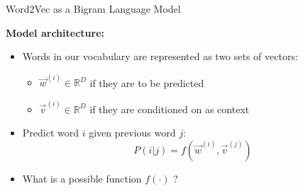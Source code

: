 \documentclass[11pt,compress,t,notes=noshow, xcolor=table]{beamer}
\begin{document}







\begin{vbframe}{Word2Vec as a Bigram Language Model}

\vfill

\textbf{Model architecture:}

\begin{itemize}
	\item Words in our vocabulary are represented as two sets of vectors:
		\begin{itemize}
			 \item $\vec w^{(i)} \in \mathbb{R}^D$ if they are to be predicted
			 \item $\vec v^{(i)} \in \mathbb{R}^D$ if they are conditioned on as context
		\end{itemize}
	\item Predict word $i$ given previous word $j$: $$P(i|j) = f(\vec w^{(i)}, \vec v^{(j)})$$
	\item \ques What is a possible function $f(\cdot)$ ?
\end{itemize}

\vfill

\end{vbframe}
\end{document}
